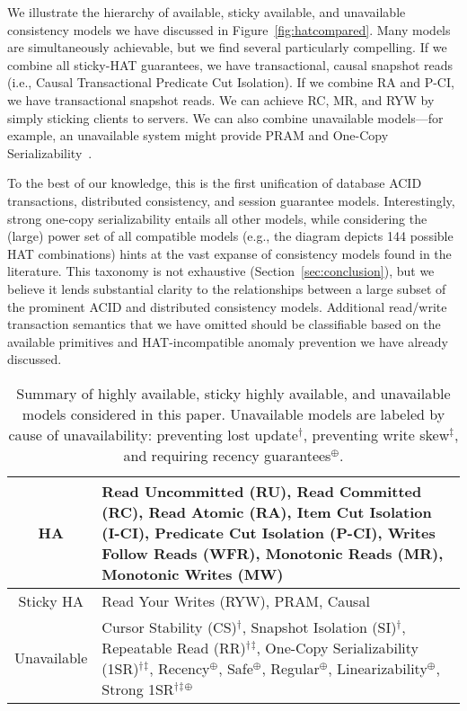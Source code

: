 We illustrate the hierarchy of available, sticky available, and
unavailable consistency models we have discussed in
Figure~\ref{fig:hatcompared}. Many models are simultaneously
achievable, but we find several particularly compelling. If we combine
all sticky-HAT guarantees, we have transactional, causal snapshot
reads (i.e., Causal Transactional Predicate Cut Isolation). If we
combine RA and P-CI, we have transactional snapshot reads. We can
achieve RC, MR, and RYW by simply sticking clients to servers. We can
also combine unavailable models---for example, an unavailable system
might provide PRAM and One-Copy
Serializability~\cite{daudjee-session}.

To the best of our knowledge, this is the first unification of
database ACID transactions, distributed consistency, and session
guarantee models. Interestingly, strong one-copy serializability
entails all other models, while considering the (large) power set of
all compatible models (e.g., the diagram depicts 144 possible HAT
combinations) hints at the vast expanse of consistency models found in
the literature. This taxonomy is not exhaustive
(Section~\ref{sec:conclusion}), but we believe it lends substantial
clarity to the relationships between a large subset of the prominent
ACID and distributed consistency models. Additional read/write
transaction semantics that we have omitted should be classifiable
based on the available primitives and HAT-incompatible anomaly
prevention we have already discussed.

 \newcommand{\lostupdate}{$^\dagger$}
 \newcommand{\rwskew}{$^\ddagger$}
 \newcommand{\linearizable}{$^\oplus$}

\begin{table}[t!]
\begin{tabular}{| c | p{6cm} | }\hline
HA & Read Uncommitted (RU), Read Committed (RC), Read
Atomic (RA), Item Cut Isolation (I-CI), Predicate Cut Isolation
(P-CI), Writes Follow Reads (WFR), Monotonic Reads (MR), Monotonic
Writes (MW)\\\hline Sticky HA & Read Your Writes (RYW), PRAM,
Causal\\\hline Unavailable & Cursor Stability (CS)\lostupdate,
Snapshot Isolation (SI)\lostupdate, Repeatable Read
(RR)\lostupdate\rwskew, One-Copy Serializability
(1SR)\lostupdate\rwskew, Recency\linearizable, Safe\linearizable,
Regular\linearizable, Linearizability\linearizable, Strong
1SR\lostupdate\rwskew\linearizable \\\hline
\end{tabular}
\caption{Summary of highly available, sticky highly available, and
  unavailable models considered in this paper. Unavailable models are
  labeled by cause of unavailability: preventing lost
  update\lostupdate, preventing write skew\rwskew, and requiring
  recency guarantees\linearizable.}
\label{table:hatcompared}
\end{table}

